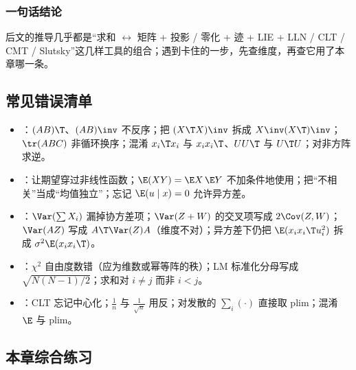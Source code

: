 \subsubsection{一句话结论}

后文的推导几乎都是“求和 $\leftrightarrow$ 矩阵 + 投影 / 零化 + 迹 + LIE + LLN / CLT / CMT / Slutsky”这几样工具的组合；遇到卡住的一步，先查维度，再查它用了本章哪一条。

\subsection{常见错误清单}

\begin{itemize}
  \item {}：$(AB)\T$、$(AB)\inv$ 不反序；把 $(X\T X)\inv$ 拆成 $X\inv(X\T)\inv$；$\tr(ABC)$ 非循环换序；混淆 $x_i\T x_i$ 与 $x_ix_i\T$、$UU\T$ 与 $U\T U$；对非方阵求逆。
  \item {}：让期望穿过非线性函数；$\E(XY)=\E X\,\E Y$ 不加条件地使用；把“不相关”当成“均值独立”；忘记 $\E(u\mid x)=0$ 允许异方差。
  \item {}：$\Var(\sum X_i)$ 漏掉协方差项；$\Var(Z+W)$ 的交叉项写成 $2\Cov(Z,W)$；$\Var(AZ)$ 写成 $A\T\Var(Z)A$（维度不对）；异方差下仍把 $\E(x_ix_i\T u_i^2)$ 拆成 $\sigma^2\E(x_ix_i\T)$。
  \item {}：$\chi^2$ 自由度数错（应为维数或幂等阵的秩）；LM 标准化分母写成 $\sqrt{N(N-1)/2}$；求和对 $i\ne j$ 而非 $i<j$。
  \item {}：CLT 忘记中心化；$\frac1n$ 与 $\frac1{\sqrt n}$ 用反；对发散的 $\sum_i(\cdot)$ 直接取 plim；混淆 $\E$ 与 plim。
\end{itemize}

\subsection{本章综合练习}

